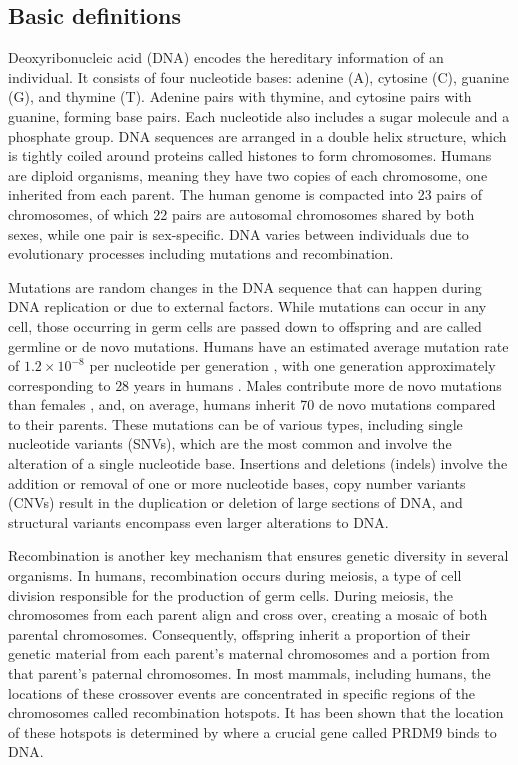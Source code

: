 \subsection{Basic definitions}
\label{sec:ch1-gb-basic-defination}
Deoxyribonucleic acid (DNA) encodes the hereditary information of an individual. It consists of four nucleotide bases: adenine (A), cytosine (C), guanine (G), and thymine (T). Adenine pairs with thymine, and cytosine pairs with guanine, forming base pairs. Each nucleotide also includes a sugar molecule and a phosphate group. DNA sequences are arranged in a double helix structure, which is tightly coiled around proteins called histones to form chromosomes. Humans are diploid organisms, meaning they have two copies of each chromosome, one inherited from each parent. The human genome is compacted into 23 pairs of chromosomes, of which 22 pairs are autosomal chromosomes shared by both sexes, while one pair is sex-specific. DNA varies between individuals due to evolutionary processes including mutations and recombination.

Mutations are random changes in the DNA sequence that can happen during DNA replication or due to external factors. While mutations can occur in any cell, those occurring in germ cells are passed down to offspring and are called germline or de novo mutations. Humans have an estimated average mutation rate of $1.2 \times 10^{-8}$ per nucleotide per generation \cite{Kong2012}, with one generation approximately corresponding to $28$ years in humans \cite{fenner2005cross,wang2023human}. Males contribute more de novo mutations than females \cite{Harris2019}, and, on average, humans inherit 70 de novo mutations compared to their parents. These mutations can be of various types, including single nucleotide variants (SNVs), which are the most common and involve the alteration of a single nucleotide base. Insertions and deletions (indels) involve the addition or removal of one or more nucleotide bases, copy number variants (CNVs) result in the duplication or deletion of large sections of DNA, and structural variants encompass even larger alterations to DNA.

Recombination is another key mechanism that ensures genetic diversity in several organisms. In humans, recombination occurs during meiosis, a type of cell division responsible for the production of germ cells. During meiosis, the chromosomes from each parent align and cross over, creating a mosaic of both parental chromosomes. Consequently, offspring inherit a proportion of their genetic material from each parent's maternal chromosomes and a portion from that parent's paternal chromosomes. In most mammals, including humans, the locations of these crossover events are concentrated in specific regions of the chromosomes called recombination hotspots. It has been shown that the location of these hotspots is determined by where a crucial gene called PRDM9 \cite{Baudat2010} binds to DNA.

